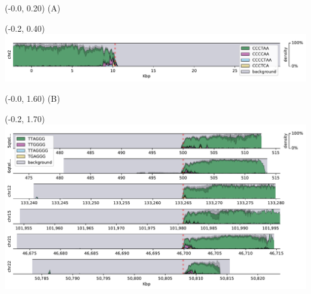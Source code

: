 \documentclass{article}
\begin{document}
\begin{textblock}{13}(-0.0,  0.20) \LARGE{(A)} \end{textblock}
\begin{textblock}{13}(-0.2,  0.40) \includegraphics[width=.55\textwidth,keepaspectratio]{densityplots/HG004-densityplot-p_arm.pdf}   \end{textblock}

\begin{textblock}{13}(-0.0,  1.60) \LARGE{(B)} \end{textblock}
\begin{textblock}{13}(-0.2,  1.70) \includegraphics{densityplots/HG004-densityplot-q_arm.pdf}   \end{textblock}
\end{document}

